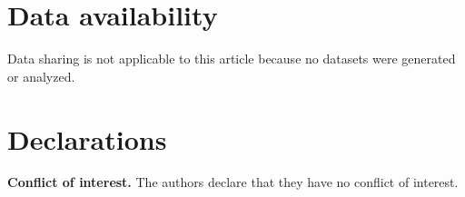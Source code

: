 \documentclass[preprint,12pt]{elsarticle}
\theoremstyle{plain}
\begin{document}
\section*{Data availability}
Data sharing is not applicable to this article because no datasets were
generated or analyzed.

\section*{Declarations}
\textbf{Conflict of interest.} The authors declare that they have no conflict
of interest.



\end{document}
